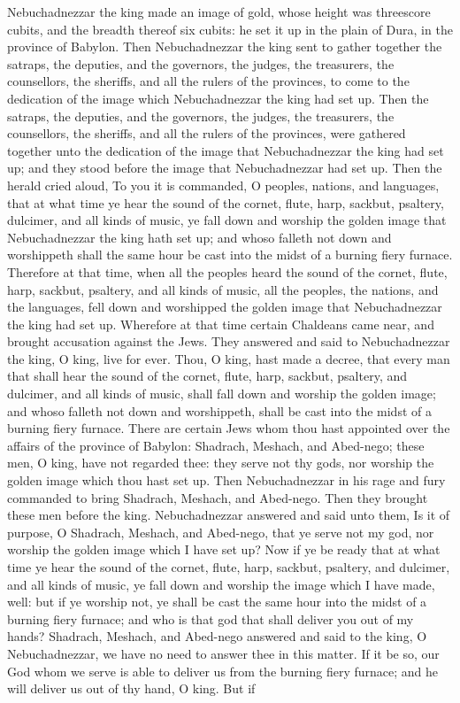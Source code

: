 Nebuchadnezzar the king made an image of gold, whose height was threescore cubits, and the breadth thereof six cubits: he set it up in the plain of Dura, in the province of Babylon. Then Nebuchadnezzar the king sent to gather together the satraps, the deputies, and the governors, the judges, the treasurers, the counsellors, the sheriffs, and all the rulers of the provinces, to come to the dedication of the image which Nebuchadnezzar the king had set up. Then the satraps, the deputies, and the governors, the judges, the treasurers, the counsellors, the sheriffs, and all the rulers of the provinces, were gathered together unto the dedication of the image that Nebuchadnezzar the king had set up; and they stood before the image that Nebuchadnezzar had set up. Then the herald cried aloud, To you it is commanded, O peoples, nations, and languages, that at what time ye hear the sound of the cornet, flute, harp, sackbut, psaltery, dulcimer, and all kinds of music, ye fall down and worship the golden image that Nebuchadnezzar the king hath set up; and whoso falleth not down and worshippeth shall the same hour be cast into the midst of a burning fiery furnace. Therefore at that time, when all the peoples heard the sound of the cornet, flute, harp, sackbut, psaltery, and all kinds of music, all the peoples, the nations, and the languages, fell down and worshipped the golden image that Nebuchadnezzar the king had set up.  Wherefore at that time certain Chaldeans came near, and brought accusation against the Jews. They answered and said to Nebuchadnezzar the king, O king, live for ever. Thou, O king, hast made a decree, that every man that shall hear the sound of the cornet, flute, harp, sackbut, psaltery, and dulcimer, and all kinds of music, shall fall down and worship the golden image; and whoso falleth not down and worshippeth, shall be cast into the midst of a burning fiery furnace. There are certain Jews whom thou hast appointed over the affairs of the province of Babylon: Shadrach, Meshach, and Abed-nego; these men, O king, have not regarded thee: they serve not thy gods, nor worship the golden image which thou hast set up.  Then Nebuchadnezzar in his rage and fury commanded to bring Shadrach, Meshach, and Abed-nego. Then they brought these men before the king. Nebuchadnezzar answered and said unto them, Is it of purpose, O Shadrach, Meshach, and Abed-nego, that ye serve not my god, nor worship the golden image which I have set up? Now if ye be ready that at what time ye hear the sound of the cornet, flute, harp, sackbut, psaltery, and dulcimer, and all kinds of music, ye fall down and worship the image which I have made, well: but if ye worship not, ye shall be cast the same hour into the midst of a burning fiery furnace; and who is that god that shall deliver you out of my hands? Shadrach, Meshach, and Abed-nego answered and said to the king, O Nebuchadnezzar, we have no need to answer thee in this matter. If it be so, our God whom we serve is able to deliver us from the burning fiery furnace; and he will deliver us out of thy hand, O king. But if 